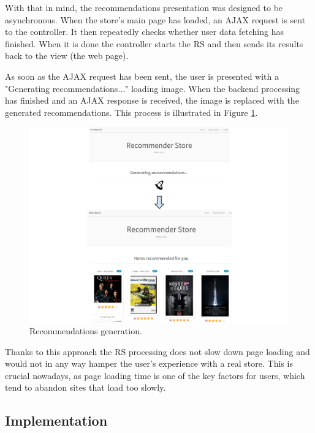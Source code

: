 \documentclass[12pt]{report}
\begin{document}
With that in mind, the recommendations presentation was designed to be asynchronous. When the store's main page has loaded, an AJAX request is sent to the controller. It then repeatedly checks whether user data fetching has finished. When it is done the controller starts the RS and then sends its results back to the view (the web page). 


As soon as the AJAX request has been sent, the user is presented with a "Generating recommendations..." loading image. When the backend processing has finished and an AJAX response is received, the image is replaced with the generated recommendations. This process is illustrated in Figure \ref{fig.reco_gen_done}.

\begin{figure}[!t]
\centering
\includegraphics[width=\textwidth]{reco_gen_done.png} 
\caption[Recommendations generation.]{Recommendations generation.}
\label{fig.reco_gen_done}
\end{figure}

\hbox{}
Thanks to this approach the RS processing does not slow down page loading and would not in any way hamper the user's experience with a real store. This is crucial nowadays, as page loading time is one of the key factors for users, which tend to abandon sites that load too slowly.

\subsection{Implementation}
\end{document}
